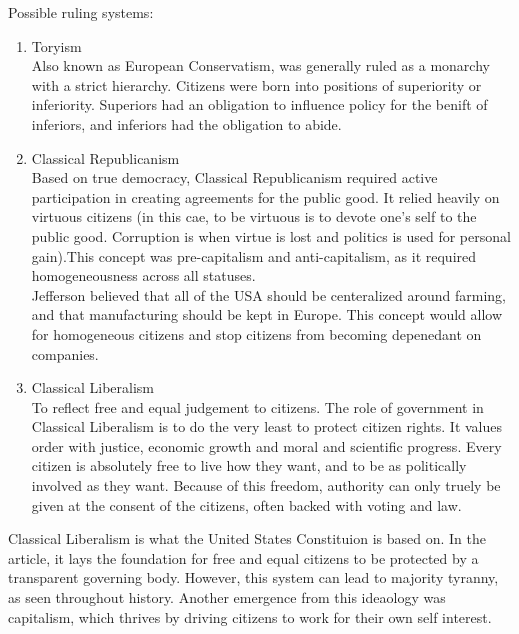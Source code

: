 \documentclass{article}
\begin{document}
Possible ruling systems:
\begin{enumerate}
  \item Toryism\\ Also known as European Conservatism, was generally ruled as a monarchy with a strict hierarchy. Citizens were born into positions of superiority or inferiority. Superiors had an obligation to influence policy for the benift of inferiors, and inferiors had the obligation to abide.
  \item Classical Republicanism\\ Based on true democracy, Classical Republicanism required active participation in creating agreements for the public good. It relied heavily on virtuous citizens (in this cae, to be virtuous is to devote one's self to the public good. Corruption is when virtue is lost and politics is used for personal gain).This concept was pre-capitalism and anti-capitalism, as it required homogeneousness across all statuses.\\ Jefferson believed that all of the USA should be centeralized around farming, and that manufacturing should be kept in Europe. This concept would allow for homogeneous citizens and stop citizens from becoming depenedant on companies.
  \item Classical Liberalism\\ To reflect free and equal judgement to citizens. The role of government in Classical Liberalism is to do the very least to protect citizen rights. It values order with justice, economic growth and moral and scientific progress. Every citizen is absolutely free to live how they want, and to be as politically involved as they want. Because of this freedom, authority can only truely be given at the consent of the citizens, often backed with voting and law.
\end{enumerate}

\indent
Classical Liberalism is what the United States Constituion is based on. In the article, it lays the foundation for free and equal citizens to be protected by a transparent governing body. However, this system can lead to majority tyranny, as seen throughout history. Another emergence from this ideaology was capitalism, which thrives by driving citizens to work for their own self interest.
\end{document}
